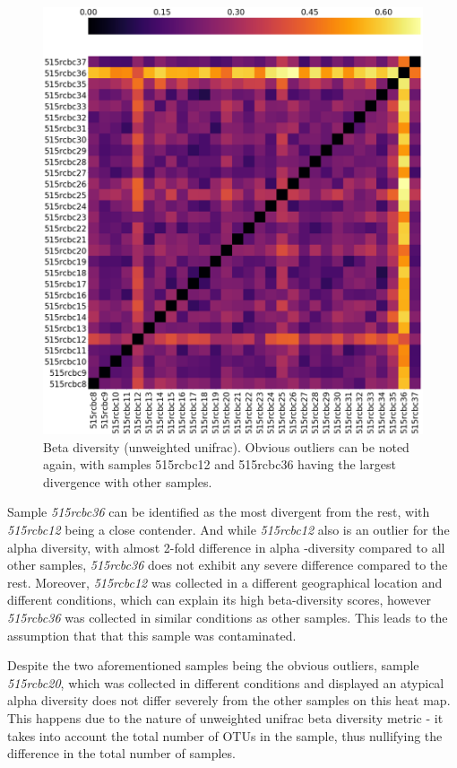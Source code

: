\documentclass[12pt,twocolumn]{article} %
\begin{document}
\begin{figure}[ht!] %
	\includegraphics[width=\linewidth]{unweighted_beta.png}
	\caption{Beta diversity (unweighted unifrac). Obvious outliers can be noted again, with samples 515rcbc12 and 515rcbc36 having the largest divergence with other samples.}
	\label{fig:beta_diversity}
\end{figure}
\par
 Sample \textit{515rcbc36} can be identified as the most divergent from the rest, with \textit{515rcbc12} being a close contender. And while \textit{515rcbc12} also is an outlier for the alpha diversity, with almost 2-fold difference in alpha -diversity compared to all other samples, \textit{515rcbc36} does not exhibit any severe difference compared to the rest. Moreover, \textit{515rcbc12} was collected in a different geographical location and different conditions, which can explain its high beta-diversity scores, however \textit{515rcbc36} was collected in similar conditions as other samples. This leads to the assumption that that this sample was contaminated.
\par
Despite the two aforementioned samples being the obvious outliers, sample \textit{515rcbc20}, which was collected in different conditions and displayed an atypical alpha diversity does not differ severely from the other samples on this heat map. This happens due to the nature of unweighted unifrac beta diversity metric - it takes into account the total number of OTUs in the sample, thus nullifying the difference in the total number of samples.
\end{document}
